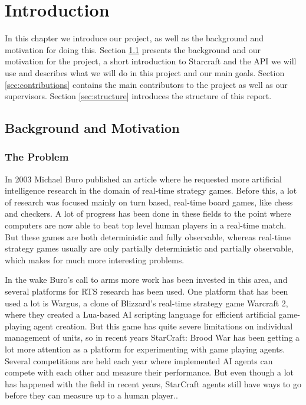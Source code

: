 
\chapter{Introduction}
In this chapter we introduce our project, as well as the background and motivation for doing this. Section \ref{sec:background} presents the background and our motivation for the project, a short introduction to Starcraft and the API we will use and describes what we will do in this project and our main goals. Section \ref{sec:contributions} contains the main contributors to the project as well as our supervisors. Section \ref{sec:structure} introduces the structure of this report.
\section{Background and Motivation}
\label{sec:background}
\subsection{The Problem}
In 2003 Michael Buro published an article where he requested more artificial
intelligence research in the domain of real-time strategy
games.\cite{buro2003real} Before this, a lot of research was focused mainly on
turn based, real-time board games, like chess and checkers. A lot of
progress has been done in these fields to the point where computers are now able
to beat top level human players in a real-time match. \cite{campbell2002deep}
But these games are both deterministic and fully observable, whereas real-time
strategy games usually are only partially deterministic and partially
observable, which makes for much more interesting problems.

In the wake Buro's call to arms more work has been invested in this area, and
several platforms for RTS research has been used. One platform that has been
used a lot is Wargus\cite{wargus}, a clone of Blizzard's real-time strategy
game Warcraft 2, where they created a Lua-based AI scripting language for
efficient artificial game-playing agent creation. But this game has quite severe
limitations on individual management of units, so in recent years StarCraft:
Brood War has been getting a lot more attention as a platform for experimenting
with game playing agents. Several competitions are held each year where
implemented AI agents can compete with each other and measure their performance.
But even though a lot has happened with the field in recent years, StarCraft
agents still have ways to go before they can measure up to a human
player.\cite{eisbotvsfong}.

